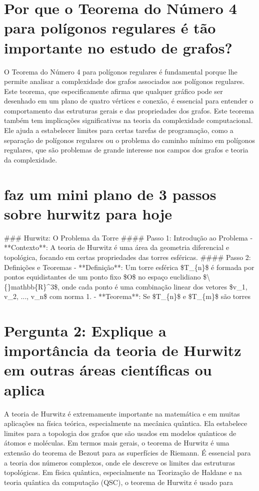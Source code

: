 \documentclass[11pt,a4paper]{article}
\begin{document}
\section{Por que o Teorema do Número 4 para polígonos regulares é tão importante no estudo de grafos?}
O Teorema do Número 4 para polígonos regulares é fundamental porque lhe permite analisar a complexidade dos grafos associados aos polígonos regulares. Este teorema, que especificamente afirma que qualquer gráfico pode ser desenhado em um plano de quatro vértices e conexão, é essencial para entender o comportamento das estruturas gerais e das propriedades dos grafos. Este teorema também tem implicações significativas na teoria da complexidade computacional. Ele ajuda a estabelecer limites para certas tarefas de programação, como a separação de polígonos regulares ou o problema do caminho mínimo em polígonos regulares, que são problemas de grande interesse nos campos dos grafos e teoria da complexidade.

\section{faz um mini plano de 3 passos sobre hurwitz para hoje}
\#\#\# Hurwitz: O Problema da Torre \#\#\#\# Passo 1: Introdução ao Problema - **Contexto**: A teoria de Hurwitz é uma área da geometria diferencial e topológica, focando em certas propriedades das torres esféricas. \#\#\#\# Passo 2: Definições e Teoremas - **Definição**: Um torre esférica \$T\_\{n\}\$ é formada por pontos equidistantes de um ponto fixo \$O\$ no espaço euclidiano \$\textbackslash\{\}mathbb\{R\}^3\$, onde cada ponto é uma combinação linear dos vetores \$v\_1, v\_2, ..., v\_n\$ com norma 1. - **Teorema**: Se \$T\_\{n\}\$ e \$T\_\{m\}\$ são torres

\section{Pergunta 2: Explique a importância da teoria de Hurwitz em outras áreas científicas ou aplica}
A teoria de Hurwitz é extremamente importante na matemática e em muitas aplicações na física teórica, especialmente na mecânica quântica. Ela estabelece limites para a topologia dos grafos que são usados em modelos quânticos de átomos e moléculas. Em termos mais gerais, o teorema de Hurwitz é uma extensão do teorema de Bezout para as superfícies de Riemann. É essencial para a teoria dos números complexos, onde ele descreve os limites das estruturas topológicas. Em física quântica, especialmente na Teorização de Haldane e na teoria quântica da computação (QSC), o teorema de Hurwitz é usado para
\end{document}
